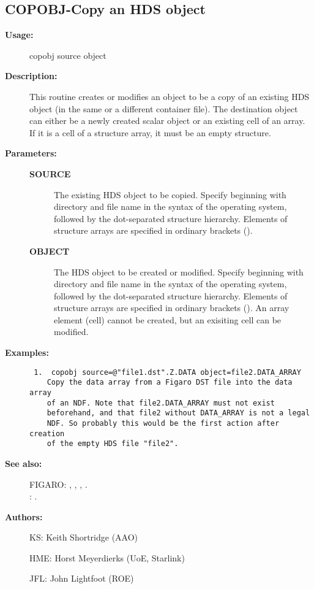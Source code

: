 \subsection{COPOBJ-\label{COPOBJ}Copy an HDS object}
\begin{description}

\item [{\bf Usage:}]
 copobj source object

\item [{\bf Description:}]
 This routine creates or modifies an object to be a copy of an
 existing HDS object (in the same or a different container file).
 The destination object can either be a newly created scalar object
 or an existing cell of an array. If it is a cell of a structure
 array, it must be an empty structure.

\item [{\bf Parameters:}]
\begin{description}
\item [{\bf SOURCE}]
 The existing HDS object to be copied. Specify beginning with
 directory and file name in the syntax of the operating system,
 followed by the dot-separated structure hierarchy. Elements of
 structure arrays are specified in ordinary brackets ().
\item [{\bf OBJECT}]
 The HDS object to be created or modified. Specify beginning
 with directory and file name in the syntax of the operating
 system, followed by the dot-separated structure hierarchy.
 Elements of structure arrays are specified in ordinary brackets
 (). An array element (cell) cannot be created, but an exisiting
 cell can be modified.
\end{description}

\item [{\bf Examples:}]
\begin{verbatim}
 1.  copobj source=@"file1.dst".Z.DATA object=file2.DATA_ARRAY
    Copy the data array from a Figaro DST file into the data array
    of an NDF. Note that file2.DATA_ARRAY must not exist
    beforehand, and that file2 without DATA_ARRAY is not a legal
    NDF. So probably this would be the first action after creation
    of the empty HDS file "file2".

\end{verbatim}

\item [{\bf See also:}]
FIGARO: , , , .\\
: .\\

\item [{\bf Authors:}]
 KS: Keith Shortridge (AAO)

 HME: Horst Meyerdierks (UoE, Starlink)

 JFL: John Lightfoot (ROE)
\end{description}
